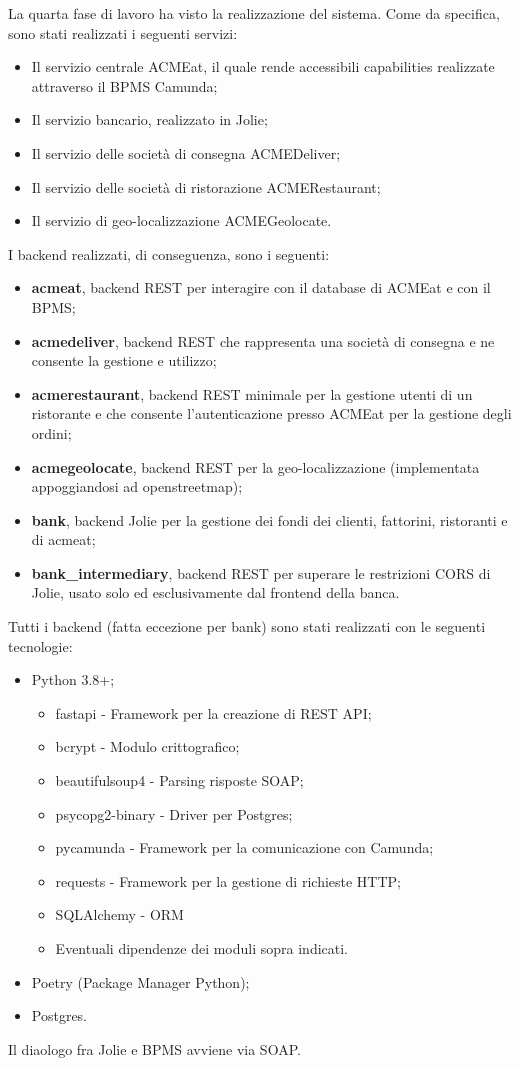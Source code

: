 \documentclass[11pt]{article} %
\begin{document}
La quarta fase di lavoro ha visto la realizzazione del sistema. Come da specifica, sono stati realizzati i seguenti servizi:
\begin{itemize}
\item Il servizio centrale ACMEat, il quale rende accessibili capabilities realizzate attraverso il BPMS Camunda;
\item Il servizio bancario, realizzato in Jolie;
\item Il servizio delle società di consegna ACMEDeliver;
\item Il servizio delle società di ristorazione ACMERestaurant;
\item Il servizio di geo-localizzazione ACMEGeolocate.
\end{itemize}
I backend realizzati, di conseguenza, sono i seguenti:
\begin{itemize}
\item \textbf{acmeat}, backend REST per interagire con il database di ACMEat e con il BPMS;
\item \textbf{acmedeliver}, backend REST che rappresenta una società di consegna e ne consente la gestione e utilizzo;
\item \textbf{acmerestaurant}, backend REST minimale per la gestione utenti di un ristorante e che consente l'autenticazione presso ACMEat per la gestione degli ordini;
\item \textbf{acmegeolocate}, backend REST per la geo-localizzazione (implementata appoggiandosi ad openstreetmap);
\item \textbf{bank}, backend Jolie per la gestione dei fondi dei clienti, fattorini, ristoranti e di acmeat;
\item \textbf{bank\_intermediary}, backend REST per superare le restrizioni CORS di Jolie, usato solo ed esclusivamente dal frontend della banca.
\end{itemize}
Tutti i backend (fatta eccezione per bank) sono stati realizzati con le seguenti tecnologie:
\begin{itemize}
\item Python 3.8+;
\begin{itemize}
\item fastapi - Framework per la creazione di REST API;
\item bcrypt - Modulo crittografico;
\item beautifulsoup4 - Parsing risposte SOAP;
\item psycopg2-binary - Driver per Postgres;
\item pycamunda - Framework per la comunicazione con Camunda;
\item requests - Framework per la gestione di richieste HTTP;
\item SQLAlchemy - ORM
\item Eventuali dipendenze dei moduli sopra indicati.
\end{itemize}
\item Poetry (Package Manager Python);
\item Postgres.
\end{itemize}
Il diaologo fra Jolie e BPMS avviene via SOAP.
\end{document}
